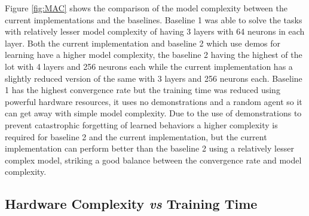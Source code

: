 Figure \ref{fig:MAC} shows the comparison of the model complexity between the current implementations and the baselines. Baseline 1 was able to solve the tasks with relatively lesser model complexity of having 3 layers with 64 neurons in each layer. Both the current implementation and baseline 2 which use demos for learning have a higher model complexity, the baseline 2 having the highest of the lot with 4 layers and 256 neurons each while the current implementation has a slightly reduced version of the same with 3 layers and 256 neurons each. Baseline 1 has the highest convergence rate but the training time was reduced using powerful hardware resources, it uses no demonstrations and a random agent so it can get away with simple model complexity. Due to the use of demonstrations to prevent catastrophic forgetting of learned behaviors a higher complexity is required for baseline 2 and the current implementation, but the current implementation can perform better than the baseline 2 using a relatively lesser complex model, striking a good balance between the convergence rate and model complexity. \\

\subsection{Hardware Complexity \textit{vs} Training Time}

